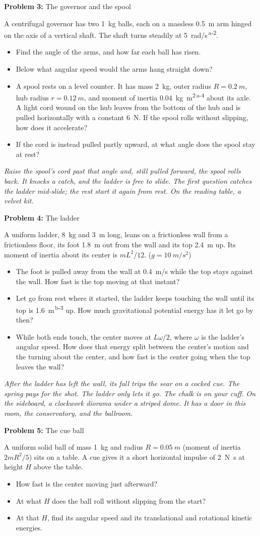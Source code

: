 \documentclass[11pt]{article}
\newcommand{\room}[1]{\par\bigskip{\large\bfseries #1}\par\nopagebreak\smallskip}
\newcommand{\scene}[1]{\par{\itshape #1}\par}
\newcommand{\problem}[2]{\par\medskip\textbf{Problem #1:} #2\par\nopagebreak}
\newenvironment{parts}{\begin{itemize}[leftmargin=3.4em,labelwidth=2.8em,labelsep=0.6em,align=left,itemsep=2pt,topsep=3pt]}{\end{itemize}}
\newcommand{\pt}[1]{\item[\textbf{#1}]}
\newcommand{\sv}[1]{\textsuperscript{\dag\,#1}}
\begin{document}
\problem{3}{The governor and the spool}
A centrifugal governor has two \SI{1}{kg} balls, each on a massless \SI{0.5}{m} arm hinged on the axis of a vertical shaft. The shaft turns steadily at \SI{5}{rad/s}\sv{a-2}.
\begin{parts}
\pt{3-a} Find the angle of the arms, and how far each ball has risen.
\pt{3-b} Below what angular speed would the arms hang straight down?
\pt{3-c} A spool rests on a level counter. It has mass \SI{2}{kg}, outer radius $R = \SI{0.2}{m}$, hub radius $r = \SI{0.12}{m}$, and moment of inertia \SI{0.04}{kg.m^2}\sv{a-4} about its axle. A light cord wound on the hub leaves from the bottom of the hub and is pulled horizontally with a constant \SI{6}{N}. If the spool rolls without slipping, how does it accelerate?
\pt{3-d} If the cord is instead pulled partly upward, at what angle does the spool stay at rest?
\end{parts}

\room{Library}
\scene{Raise the spool's cord past that angle and, still pulled forward, the spool rolls back. It knocks a catch, and the ladder is free to slide. The first question catches the ladder mid-slide; the rest start it again from rest. On the reading table, a velvet kit.}
\problem{4}{The ladder}
A uniform ladder, \SI{8}{kg} and \SI{3}{m} long, leans on a frictionless wall from a frictionless floor, its foot \SI{1.8}{m} out from the wall and its top \SI{2.4}{m} up. Its moment of inertia about its center is $mL^2/12$. ($g = \SI{10}{m/s^2}$)
\begin{parts}
\pt{4-a} The foot is pulled away from the wall at \SI{0.4}{m/s} while the top stays against the wall. How fast is the top moving at that instant?
\pt{4-b} Let go from rest where it started, the ladder keeps touching the wall until its top is \SI{1.6}{m}\sv{b-3} up. How much gravitational potential energy has it let go by then?
\pt{4-c} While both ends touch, the center moves at $L\omega/2$, where $\omega$ is the ladder's angular speed. How does that energy split between the center's motion and the turning about the center, and how fast is the center going when the top leaves the wall?
\end{parts}

\room{Billiard room}
\scene{After the ladder has left the wall, its fall trips the sear on a cocked cue. The spring pays for the shot. The ladder only lets it go. The chalk is on your cuff. On the sideboard, a clockwork diorama under a striped dome. It has a door in this room, the conservatory, and the ballroom.}
\problem{5}{The cue ball}
A uniform solid ball of mass \SI{1}{kg} and radius $R = \SI{0.05}{m}$ (moment of inertia $2mR^2/5$) sits on a table. A cue gives it a short horizontal impulse of \SI{2}{N.s} at height $H$ above the table.
\begin{parts}
\pt{5-a} How fast is the center moving just afterward?
\pt{5-b} At what $H$ does the ball roll without slipping from the start?
\pt{5-c} At that $H$, find its angular speed and its translational and rotational kinetic energies.
\end{parts}
\end{document}
